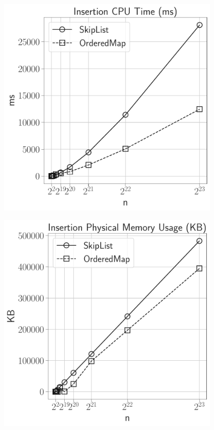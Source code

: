 \documentclass[12pt]{article}
\begin{document}
\begin{figure}[H]
	\centering

	\begin{minipage}{0.32\textwidth}
		\centering
		\includegraphics[width=\linewidth]{../notebook/plot/sl_insertion_cpu_time_(ms).pdf}
		\label{fig:cpu_time}
	\end{minipage}\hfill
	\begin{minipage}{0.32\textwidth}
		\centering
		\includegraphics[width=\linewidth]{../notebook/plot/sl_insertion_physical_memory_usage_(kb).pdf}

\end{minipage}
\end{figure}
\end{document}
